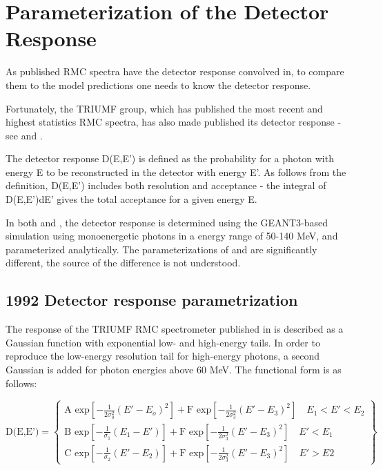 \section { Parameterization of the Detector Response}

As published RMC spectra have the detector response convolved in, to compare
them to the model predictions one needs to know the detector response.

Fortunately, the TRIUMF group, which has published the most recent and highest statistics
RMC spectra, has also made published its detector response -
see \cite{RMC_1992_PhysRevC.46.1094} and \cite{RMC_1998_PhysRevC.58.1767}. 

The detector response D(E,E') is defined as the probability for a photon
with energy E to be reconstructed in the detector with energy E'. As follows from the
definition, D(E,E') includes both resolution and acceptance - the integral of D(E,E')dE'
gives the total acceptance for a given energy E.

In both \cite{RMC_1992_PhysRevC.46.1094} and \cite{RMC_1998_PhysRevC.58.1767}, the
detector response is determined using the GEANT3-based simulation using monoenergetic
photons in a energy range of 50-140 MeV, and parameterized analytically.
The parameterizations of  \cite{RMC_1992_PhysRevC.46.1094} and \cite{RMC_1998_PhysRevC.58.1767}
are significantly different, the source of the difference is not understood.

\subsection { 1992 Detector response parametrization }

The response of the TRIUMF RMC spectrometer published in \cite{RMC_1992_PhysRevC.46.1094}
is described as a Gaussian function with exponential low- and  high-energy tails.
In order to reproduce the low-energy resolution tail for high-energy photons, a second Gaussian
is added for photon energies above 60 MeV. The functional form is as follows:

\begin{equation}
  \label{eq:001}
\text{D(E,E')}= \left\{
\begin{array}{ll}
                \text{A exp}\left[-\frac{1}{2\sigma_0^2}(E'-E_o)^2\right]+
                \text{F exp}\left[-\frac{1}{2\sigma_3^2}(E'-E_3)^2\right]
 \quad E_1<E'<E_2 \\
                \text{B exp}\left[-\frac{1}{\sigma_1}(E_1-E') \right]+
                \text{F exp}\left[-\frac{1}{2\sigma_3^2}(E'-E_3)^2\right]
 \quad E'<E_1      \\  
                \text{C exp}\left[-\frac{1}{\sigma_2}(E'-E_2)\right]+
                \text{F exp}\left[-\frac{1}{2\sigma_3^2}(E'-E_3)^2\right]
 \quad E'>E2     
 \end{array}
 \right \}
\end{equation}
 
